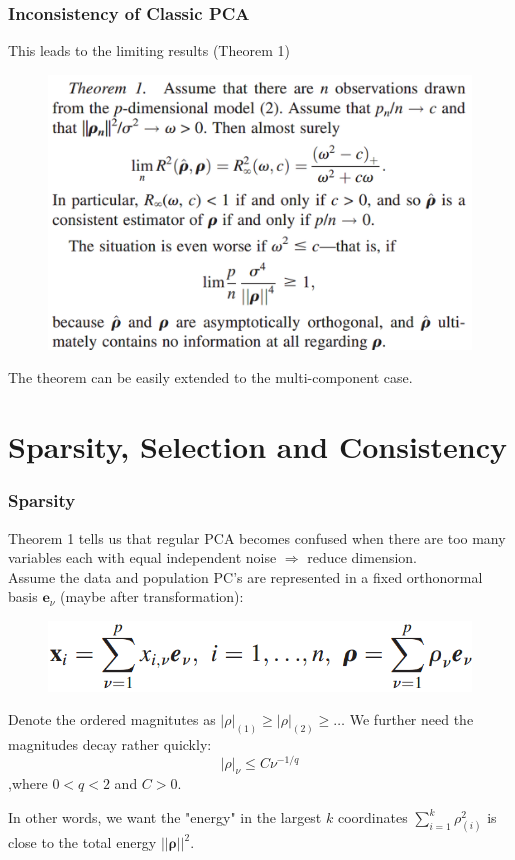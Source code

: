 \documentclass{beamer}
\begin{document}
	
	\begin{frame}
		\frametitle{Inconsistency of Classic PCA}
		This leads to the limiting results (Theorem 1)
		\begin{figure}
			\includegraphics[width=0.8\linewidth]{image002.png}
		\end{figure}
		The theorem can be easily extended to the multi-component case.
	\end{frame}
	
	\section{Sparsity, Selection and Consistency}
	\begin{frame}
		\frametitle{Sparsity}
		Theorem 1 tells us that regular PCA becomes confused when there are too many variables each with equal independent noise $\Rightarrow$ reduce dimension.\\
		Assume the data and population PC's are represented in a fixed orthonormal basis  ${\bm{e}_{\nu}}$ (maybe after transformation):
		\begin{figure}
			\includegraphics[width=0.5\linewidth]{image003.png}
		\end{figure}
		Denote the ordered magnitutes as $|\rho|_{(1)} \geq |\rho|_{(2)} \geq \ldots$ We further need the magnitudes decay rather quickly:
		$$|\rho|_{\nu} \leq C\nu^{-1/q}$$
		,where $0<q<2$ and $C>0$.
		
		In other words, we want the "energy" in the largest $k$ coordinates $\sum_{i=1}^{k}\rho^2_{(i)}$ is close to the total energy $||\bm{\rho}||^2$.
	\end{frame}
	
\end{document}
